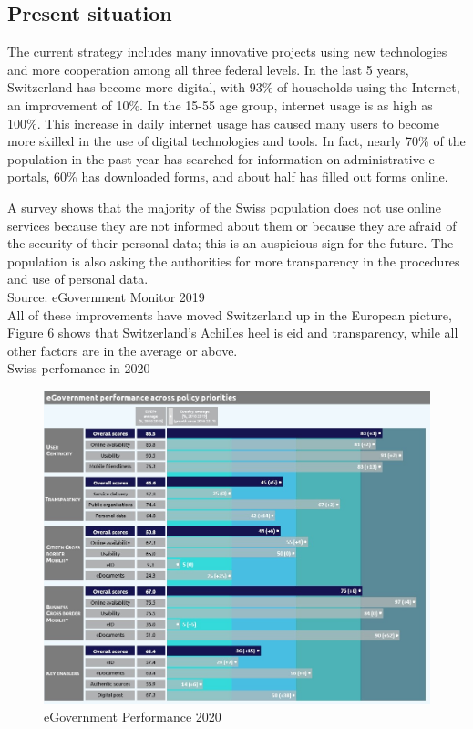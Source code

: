 \subsection{Present situation}
The current strategy includes many innovative projects using new technologies and more cooperation among all three federal levels. 
In the last 5 years, Switzerland has become more digital, with 93\% of households using the Internet, an improvement of 10\%\cite{fact2020}.
In the 15-55 age group, internet usage is as high as 100\%.
This increase in daily internet usage has caused many users to become more skilled in the use of digital technologies and tools.
In fact, nearly 70\% of the population in the past year has searched for information on administrative e-portals, 60\% has downloaded forms, and about half has filled out forms online.

A survey shows that the majority of the Swiss population does not use online services because they are not informed about them or because they are afraid of the security of their personal data; this is an auspicious sign for the future. The population is also asking the authorities for more transparency in the procedures and use of personal data.\\
Source: eGovernment Monitor 2019\cite{eGov2019Monitor}\\

All of these improvements have moved Switzerland up in the European picture, Figure 6 shows that Switzerland's Achilles heel is \acrlong{eid} and transparency, while all other factors are in the average or above.\\
\newpage
Swiss perfomance in 2020
\begin{figure}[!htb]
\centering
\includegraphics[width=1\textwidth]{images/key2020.jpg}
\caption{eGovernment Performance 2020 \cite{eGov2020bench}}
\label{egov2020}
\end{figure}
\FloatBarrier

